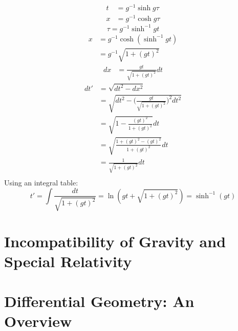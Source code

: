 \documentclass[9pt]{report}
\begin{document}
\begin{enumerate}
\[
  \begin{align}
    t &= g^{-1} \sinh g \tau \\
    x &= g^{-1} \cosh g \tau
  \end{align}
\]
\[
  \tau = g^{-1}\sinh^{-1} gt
\]
\[
  \begin{align}
    x &= g^{-1} \cosh(\sinh^{-1} gt) \\
      &= g^{-1} \sqrt{1 + (gt)^2}
  \end{align}
\]
\[
  \begin{align}
    dx &= \frac{gt}{\sqrt{1 + (gt)^2}} dt
  \end{align}
\]
\[
  \begin{align}
    dt' &= \sqrt{dt^2 - dx^2} \\
        &= \sqrt{dt^2 - \Big(\frac{gt}{\sqrt{1 + (gt)^2} }\Big)^2dt^2}\\
        &= \sqrt{1 - \frac{(gt)^2}{1 + (gt)^2}}dt\\
        &= \sqrt{\frac{1 + (gt)^2 - (gt)^2}{1 + (gt)^2 }}dt\\
        &= \frac{1}{\sqrt{1 + (gt)^2 }}dt\\
  \end{align}
\]
Using an integral table:
\[
  t' = \int \frac{dt}{\sqrt{1+(gt)^2} } = \ln (gt + \sqrt{1+(gt)^2}) = \sinh^{-1}(gt)
\]
\end{enumerate}
\chapter{Incompatibility of Gravity and Special Relativity}
\chapter{Differential Geometry: An Overview}
\end{document}
